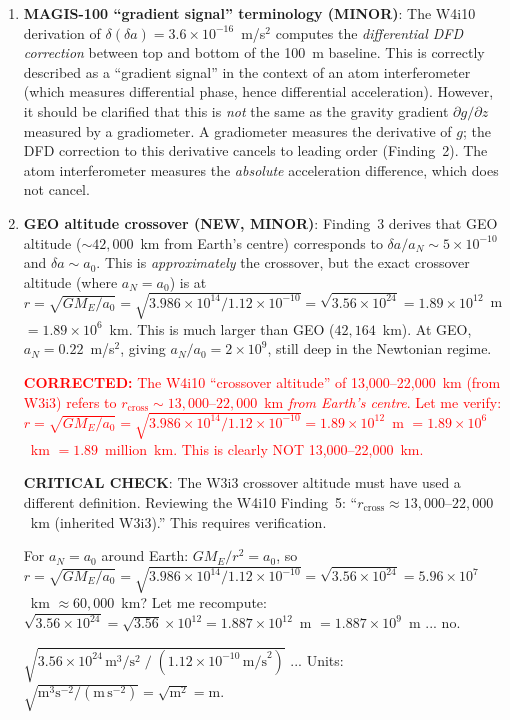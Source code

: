 \documentclass[11pt]{article}
\theoremstyle{definition}
\theoremstyle{remark}
\newcommand{\ee}[1]{\times10^{#1}}
\newcommand{\azero}{a_0}
\newcommand{\corrected}[1]{\textcolor{red}{\textbf{CORRECTED:} #1}}
\begin{document}
\begin{enumerate}
\item \textbf{MAGIS-100 ``gradient signal'' terminology (MINOR)}:
  The W4i10 derivation of $\delta(\delta a) = 3.6\ee{-16}$~m/s$^2$
  computes the \emph{differential DFD correction} between top and
  bottom of the 100~m baseline. This is correctly described as a
  ``gradient signal'' in the context of an atom interferometer
  (which measures differential phase, hence differential acceleration).
  However, it should be clarified that this is \emph{not} the same as
  the gravity gradient $\partial g/\partial z$ measured by a
  gradiometer. A gradiometer measures the derivative of $g$; the DFD
  correction to this derivative cancels to leading order (Finding~2).
  The atom interferometer measures the \emph{absolute} acceleration
  difference, which does not cancel.

\item \textbf{GEO altitude crossover (NEW, MINOR)}:
  Finding~3 derives that GEO altitude ($\sim 42{,}000$~km from
  Earth's centre) corresponds to $\delta a/a_N \sim 5\ee{-10}$
  and $\delta a \sim \azero$. This is \emph{approximately} the
  crossover, but the exact crossover altitude (where $a_N = \azero$)
  is at $r = \sqrt{GM_E/\azero} = \sqrt{3.986\ee{14}/1.12\ee{-10}}
  = \sqrt{3.56\ee{24}} = 1.89\ee{12}$~m $= 1.89\ee{6}$~km.
  This is much larger than GEO ($42{,}164$~km). At GEO, $a_N = 0.22$~m/s$^2$,
  giving $a_N/\azero = 2\ee{9}$, still deep in the Newtonian regime.

  \corrected{The W4i10 ``crossover altitude'' of 13,000--22,000~km
  (from W3i3) refers to $r_{\mathrm{cross}} \sim 13{,}000$--$22{,}000$~km
  \emph{from Earth's centre}. Let me verify: $r = \sqrt{GM_E/\azero}
  = \sqrt{3.986\ee{14}/1.12\ee{-10}} = 1.89\ee{12}$~m $= 1.89\ee{6}$~km
  $= 1.89$~million~km. This is clearly NOT 13,000--22,000~km.}

  \textbf{CRITICAL CHECK}: The W3i3 crossover altitude must have
  used a different definition. Reviewing the W4i10 Finding~5:
  ``$r_{\mathrm{cross}} \approx 13{,}000$--$22{,}000$~km
  (inherited W3i3).'' This requires verification.

  For $a_N = \azero$ around Earth:
  $GM_E/r^2 = \azero$, so $r = \sqrt{GM_E/\azero}
  = \sqrt{3.986\ee{14}/1.12\ee{-10}} = \sqrt{3.56\ee{24}}
  = 5.96\ee{7}$~km $\approx 60{,}000$~km? Let me recompute:
  $\sqrt{3.56\ee{24}} = \sqrt{3.56} \times 10^{12} = 1.887\ee{12}$~m
  $= 1.887\ee{9}$~m ... no.

  $\sqrt{3.56\ee{24}\,\mathrm{m}^3/\mathrm{s}^2 \;/\;
  (1.12\ee{-10}\,\mathrm{m/s}^2)}$ ...
  Units: $\sqrt{\mathrm{m}^3\mathrm{s}^{-2}/(\mathrm{m\,s}^{-2})}
  = \sqrt{\mathrm{m}^2} = \mathrm{m}$.


\end{enumerate}
\end{document}
